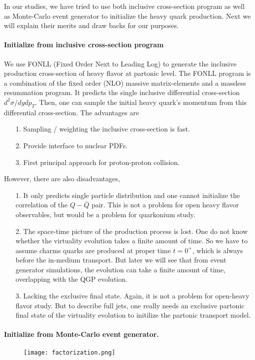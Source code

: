 In our studies, we have tried to use both inclusive cross-section program as well as Monte-Carlo event generator to initialize the heavy quark production.
Next we will explain their merits and draw backs for our purposes.

\paragraph{Initialize from inclusive cross-section program}
We use FONLL (Fixed Order Next to Leading Log) to generate the inclusive production cross-section of heavy flavor at partonic level.
The FONLL program is a combination of the fixed order (NLO) massive matrix-elements and a massless resummation program.
It predicts the single inclusive differential cross-section $d^2\sigma/dydp_T$. 
Then, one can sample the initial heavy quark's momentum from this differential cross-section.
The advantages are
\begin{itemize}
\item[1.] Sampling / weighting the inclusive cross-section is fast.
\item[2.] Provide interface to nuclear PDFs.
\item[3.] First principal approach for proton-proton collision.
\end{itemize} 
However, there are also disadvantages, 
\begin{itemize}
\item[1.] It only predicts single particle distribution and one cannot initialize the correlation of the $Q-\bar{Q}$ pair. This is not a problem for open heavy flavor observables, but would be a problem for quarkonium study.
\item[2.] The space-time picture of the production process is lost. One do not know whether the virtuality evolution takes a finite amount of time. So we have to assume charms quarks are produced at proper time $t=0^{+}$, which is always before the in-medium transport. But later we will see that from event generator simulations, the evolution can take a finite amount of time, overlapping with the QGP evolution.
\item[3.] Lacking the exclusive final state. Again, it is not a problem for open-heavy flavor study. But to describe full jets, one really needs an exclusive partonic final state of the virtuality evolution to initilize the partonic transport model.
\end{itemize}

\paragraph{Initialize from Monte-Carlo event generator.}
\begin{figure}
\centering
\texttt{[image: factorization.png]}
\caption{
}
\label{fig:factorization}
\end{figure}

